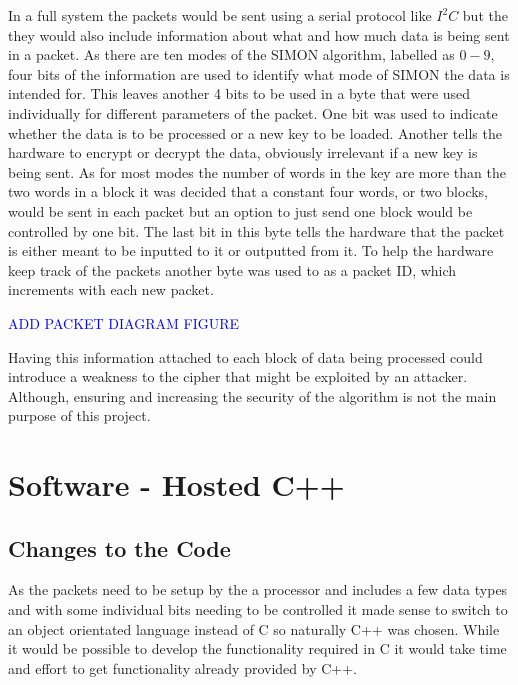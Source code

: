 \documentclass[12pt,twoside,a4paper]{report}
\begin{document}
	In a full system the packets would be sent using a serial protocol like $I^2C$ but the they would also include information about what and how much data is being sent in a packet. As there are ten modes of the SIMON algorithm, labelled as $0 - 9$, four bits of the information are used to identify what mode of SIMON the data is intended for. This leaves another 4 bits to be used in a byte that were used individually for different parameters of the packet. One bit was used to indicate whether the data is to be processed or a new key to be loaded. Another tells the hardware to encrypt or decrypt the data, obviously irrelevant if a new key is being sent. As for most modes the number of words in the key are more than the two words in a block it was decided that a constant four words, or two blocks, would be sent in each packet but an option to just send one block would be controlled by one bit. The last bit in this byte tells the hardware that the packet is either meant to be inputted to it or outputted from it. To help the hardware keep track of the packets another byte was used to as a packet ID, which increments with each new packet.
    
	\textcolor{blue}{ADD PACKET DIAGRAM FIGURE}
	
	Having this information attached to each block of data being processed could introduce a weakness to the cipher that might be exploited by an attacker. Although, ensuring and increasing the security of the algorithm is not the main purpose of this project.
    
	\section{Software - Hosted C++}
	\label{section:HOSTEDF}
	
	\subsection{Changes to the Code}
	
	As the packets need to be setup by the a processor and includes a few data types and with some individual bits needing to be controlled it made sense to switch to an object orientated language instead of C so naturally C++ was chosen. While it would be possible to develop the functionality required in C it would take time and effort to get functionality already provided by C++.
\end{document}
